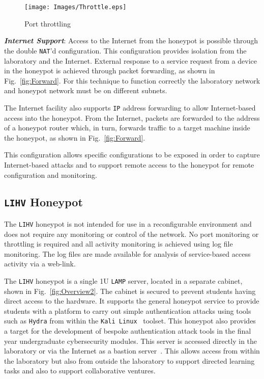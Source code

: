 \documentclass[10pt,journal]{IEEEtran}
\begin{document}
\begin{figure}[h]
\begin{center}
	\texttt{[image: Images/Throttle.eps]}
\caption{Port throttling\label{fig:throttling}}
\end{center}
\end{figure}

\noindent\textit{\textbf{Internet Support}}:
Access to the Internet from the honeypot is possible through the double
\texttt{NAT}'d configuration. This configuration provides isolation from the
laboratory and the Internet. External response to a service request from a
device in the honeypot is achieved through packet forwarding, as shown in
Fig.~\ref{fig:Forward}. For this technique to function correctly the laboratory
network and honeypot network must be on different subnets.

The Internet facility also supports \texttt{IP} address forwarding to allow
Internet-based access into the honeypot. From the Internet, packets are
forwarded to the address of a honeypot router which, in turn, forwards traffic
to a target machine inside the honeypot, as shown in Fig.~\ref{fig:Forward}.

This configuration allows specific configurations to be exposed in order to
capture Internet-based attacks and to support remote access to the honeypot for
remote configuration and monitoring.

\subsection{\texttt{LIHV} Honeypot}

The \texttt{LIHV} honeypot is not intended for use in a reconfigurable
environment and does not require any monitoring or control of the network. No
port monitoring or throttling is required and all activity monitoring is
achieved using log file monitoring. The log files are made available 
for analysis of service-based access activity via a web-link.

The \texttt{LIHV} honeypot is a single 1U \texttt{LAMP} server, located in a
separate cabinet, shown in Fig.~\ref{fig:Overview2}. The cabinet is secured to
prevent students having direct access to the hardware. It supports the general
honeypot service to provide students with a platform to carry out simple
authentication attacks using tools such as \texttt{Hydra} from within the
\texttt{Kali Linux}~\cite{OS:17} toolset. This honeypot also provides a target
for the development of bespoke authentication attack tools in the final year
undergraduate cybersecurity modules.  This server is accessed directly in the
laboratory or via the Internet as a bastion server~\cite{MB:05}. This allows
access from within the laboratory but also from outside the laboratory to
support directed learning tasks and also to support collaborative ventures.
\end{document}
